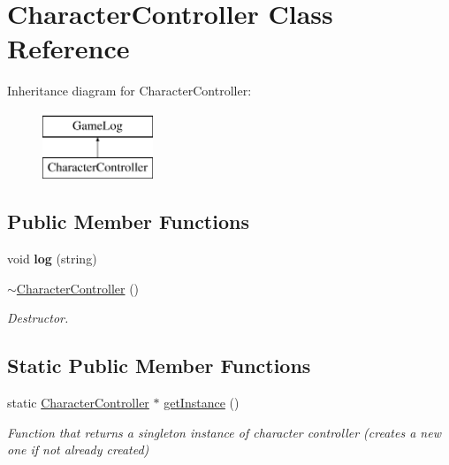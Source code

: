 \hypertarget{class_character_controller}{}\section{Character\+Controller Class Reference}
\label{class_character_controller}
Inheritance diagram for Character\+Controller\+:\begin{figure}[H]
\begin{center}
\leavevmode
\includegraphics[height=2.000000cm]{class_character_controller}
\end{center}
\end{figure}
\subsection*{Public Member Functions}
\begin{DoxyCompactItemize}
\item 
\hypertarget{class_character_controller_a639c1317a4d845eb9bca221e20ba013f}{}\label{class_character_controller_a639c1317a4d845eb9bca221e20ba013f} 
void {\bfseries log} (string)
\item 
\hypertarget{class_character_controller_a9f8da1695e15adaf014f0aa7dfa9f658}{}\label{class_character_controller_a9f8da1695e15adaf014f0aa7dfa9f658} 
\hyperlink{class_character_controller_a9f8da1695e15adaf014f0aa7dfa9f658}{$\sim$\+Character\+Controller} ()
\begin{DoxyCompactList}\small\item\em Destructor. \end{DoxyCompactList}\end{DoxyCompactItemize}
\subsection*{Static Public Member Functions}
\begin{DoxyCompactItemize}
\item 
\hypertarget{class_character_controller_a6d652aadc4ba57e789c842769b7e96e2}{}\label{class_character_controller_a6d652aadc4ba57e789c842769b7e96e2} 
static \hyperlink{class_character_controller}{Character\+Controller} $\ast$ \hyperlink{class_character_controller_a6d652aadc4ba57e789c842769b7e96e2}{get\+Instance} ()
\begin{DoxyCompactList}\small\item\em Function that returns a singleton instance of character controller (creates a new one if not already created) \end{DoxyCompactList}\end{DoxyCompactItemize}
